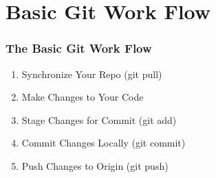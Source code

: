 
\section[Basic Git]{Basic Git Work Flow}

\begin{frame}
\frametitle{\large The Basic Git Work Flow}
\begin{enumerate}
\item Synchronize Your Repo (git pull)
\item Make Changes to Your Code
\item Stage Changes for Commit (git add)
\item Commit Changes Locally (git commit)
\item Push Changes to Origin (git push)
\end{enumerate}
\end{frame}